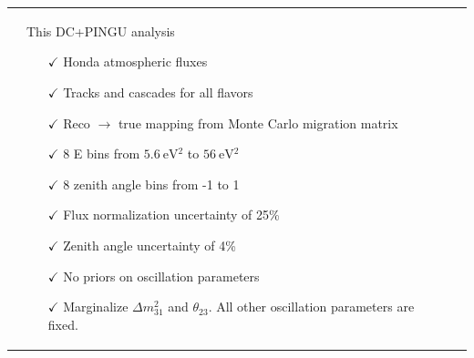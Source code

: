 \documentclass[draft=True]{revtex4-2}
\newcommand{\dm}{\Delta m^2_{31}}
\begin{document}
\begin{tabular}{p{55mm}p{55mm}p{55mm}}
\begin{itemize}
      \end{itemize} &
    This DC+PINGU analysis
      \begin{itemize}
         \item[$\checkmark$] Honda atmospheric fluxes
         \item[$\checkmark$] Tracks and cascades for all flavors
         \vspace{1em} 
         \item[$\checkmark$] Reco $\to$ true mapping from Monte Carlo migration matrix
         \item[$\checkmark$] 8 E bins from $\SI{5.6}{\electronvolt^2}$ to $\SI{56}{\electronvolt^2}$
         \item[$\checkmark$] 8 zenith angle bins from -1 to 1
         \item[$\checkmark$] Flux normalization uncertainty of 25\%
         \item[$\checkmark$] Zenith angle uncertainty of 4\% 
         \item[$\checkmark$] No priors on oscillation parameters 
         \item[$\checkmark$] Marginalize $\dm$ and $\theta_{23}$. All other oscillation parameters are fixed.
      \end{itemize} 
\end{tabular}



\end{document}
